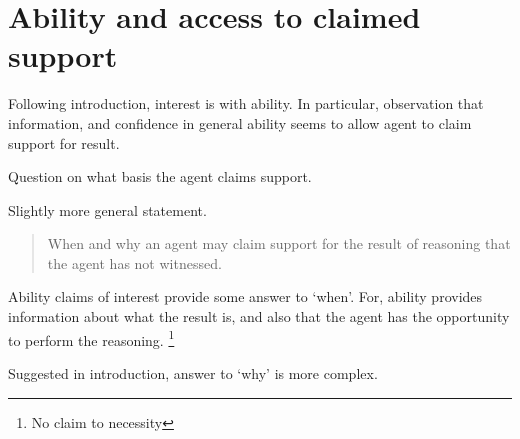 \section{Ability and access to claimed support}
\label{sec:abil-access-supp}

\begin{note}
  Following introduction, interest is with ability.
  In particular, observation that \gsi{} information, and confidence in general ability seems to allow agent to claim support for result.

  Question on what basis the agent claims support.

  Slightly more general statement.
  \begin{quote}
    When and why an agent may claim support for the result of reasoning that the agent has not witnessed.
  \end{quote}
  Ability claims of interest provide some answer to `when'.
  For, ability provides information about what the result is, and also that the agent has the opportunity to perform the reasoning.\nolinebreak
  \footnote{No claim to necessity}

  Suggested in introduction, answer to `why' is more complex.
\end{note}

